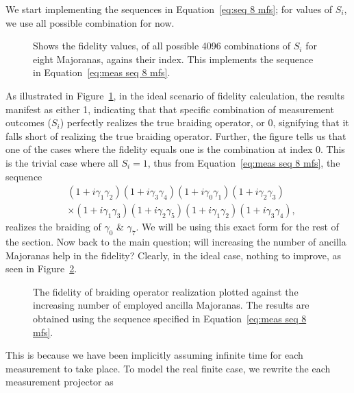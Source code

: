 \documentclass{article}
\begin{document}
\vspace{12pt}
We start implementing the sequences in Equation~\ref{eq:seq 8 mfs}; for values of $ S_i $, we use all possible combination for now.
\begin{figure}
	\begin{center}
		
	\end{center}
	\caption{Shows the fidelity values, of all possible 4096 combinations of $ S_i $ for eight Majoranas, agains their index. This implements the sequence in Equation~\ref{eq:meas seq 8 mfs}.}
	\label{fig:ideal fids all combs}
\end{figure}
As illustrated in Figure~\ref{fig:ideal fids all combs}, in the ideal scenario of fidelity calculation, the results manifest as either 1, indicating that that specific combination of measurement outcomes ($ S_i $) perfectly realizes the true braiding operator, or 0, signifying that it falls short of realizing the true braiding operator. Further, the figure tells us that one of the cases where the fidelity equals one is the combination at index 0. This is the trivial case where all $ S_i=1 $, thus from Equation~\ref{eq:meas seq 8 mfs}, the sequence
\[
	\begin{aligned}
		 & (1+ i \gamma_1 \gamma_2)(1+ i \gamma_3 \gamma_4)(1+ i \gamma_0 \gamma_1) (1+ i \gamma_2 \gamma_3)        \\
		 & \times (1+ i \gamma_1 \gamma_3)(1+ i \gamma_2 \gamma_5)(1+ i \gamma_1 \gamma_2)(1+ i \gamma_3 \gamma_4),
	\end{aligned}
\]
realizes the braiding of $ \gamma_0 $ \& $ \gamma_7 $. We will be using this exact form for the rest of the section. Now back to the main question; will increasing the number of ancilla Majoranas help in the fidelity? Clearly, in the ideal case, nothing to improve, as seen in Figure~\ref{fig:fid vs N ideal}.
\begin{figure}
	\begin{center}
		
	\end{center}
	\caption{The fidelity of braiding operator realization plotted against the increasing number of employed ancilla Majoranas. The results are obtained using the sequence specified in Equation~\ref{eq:meas seq 8 mfs}.}
	\label{fig:fid vs N ideal}
\end{figure}
This is because we have been implicitly assuming infinite time for each measurement to take place. To model the real finite case, we rewrite the each measurement projector as
\end{document}
